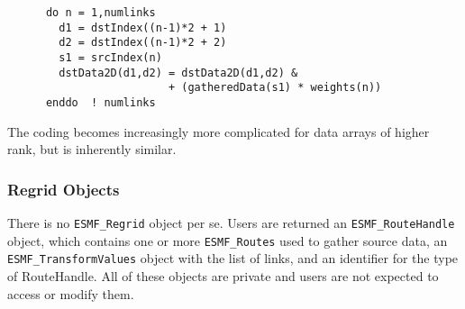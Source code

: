\begin{verbatim}
      do n = 1,numlinks     
        d1 = dstIndex((n-1)*2 + 1)
        d2 = dstIndex((n-1)*2 + 2) 
        s1 = srcIndex(n)           
        dstData2D(d1,d2) = dstData2D(d1,d2) &
                         + (gatheredData(s1) * weights(n))
      enddo  ! numlinks
\end{verbatim}

The coding becomes increasingly more complicated for data arrays of higher rank,
but is inherently similar.



\subsubsection{Regrid Objects}

There is no {\tt ESMF\_Regrid} object per se.  Users are returned an
{\tt ESMF_RouteHandle} object, which contains one or more {\tt ESMF\_Routes}
used to gather source data, an {\tt ESMF\_TransformValues} object with the
list of links, and an identifier for the type of RouteHandle.  All of these
objects are private and users are not expected to access or modify them.
